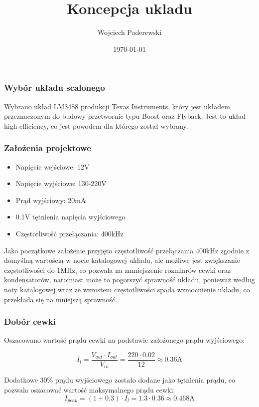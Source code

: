 \documentclass[../../main.tex]{subfiles}
\author{Wojciech Paderewski}
\date{\today}
\title{Koncepcja ukladu}
\begin{document}
\subsubsection{Wybór układu scalonego}
Wybrano układ LM3488 produkcji Texas Instruments, który jest układem przeznaczonym do budowy przetwornic typu Boost oraz Flyback. 
Jest to układ high efficiency, co jest powodem dla którego został wybrany.

\subsubsection{Założenia projektowe}
\begin{itemize}
    \item Napięcie wejściowe: 12\si{\volt}
    \item Napięcie wyjściowe: 130-220\si{\volt}
    \item Prąd wyjściowy: 20\si{\milli\ampere}
    \item 0.1\si{\volt} tętnienia napięcia wyjściowego
    \item Częstotliwość przełączania: 400\si{\kilo\hertz}
\end{itemize}

Jako początkowe założenie przyjęto częstotliwość przełączania 400kHz zgodnie z domyślną wartością w nocie katalogowej układu, 
ale możliwe jest zwiększanie częstotliwości do 1MHz, co pozwala na zmniejszenie rozmiarów cewki oraz kondensatorów, natomiast może to
pogorszyć sprawność układu, ponieważ według noty katalogowej wraz ze wzrostem częstotliwości spada wzmocnienie układu, co przekłada się na mniejszą sprawność.

\subsubsection{Dobór cewki}
Oszacowano wartość prądu cewki na podstawie założonego prądu wyjściowego:

\begin{equation}
    I_{l} = \frac{V_{out} \cdot I_{out}}{V_{in}} = \frac{220 \cdot 0.02}{12} \approx 0.36\si{\ampere}
\end{equation}

Dodatkowe 30\% prądu wyjściowego zostało dodane jako tętnienia prądu, co pozwala oszacować wartość maksymalnego prądu cewki:
\begin{equation}
    I_{peak} = (1+0.3) \cdot I_{l} = 1.3 \cdot 0.36 \approx 0.468\si{\ampere}
\end{equation}
\end{document}
